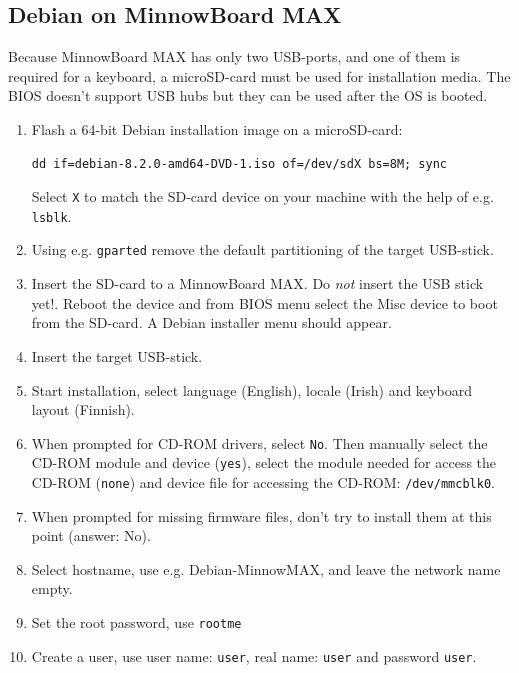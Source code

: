\documentclass[a4paper,11pt]{article}
\newcommand{\cmd}[1]{\texttt{#1}}
\begin{document}
\subsection{Debian on MinnowBoard MAX}
\label{minnowdebian}

Because MinnowBoard MAX has only two USB-ports, and one of them is required for a keyboard, a microSD-card must be used for installation media. The BIOS doesn't support USB hubs but they can be used after the OS is booted.

\begin{enumerate}
\item Flash a 64-bit Debian installation image on a microSD-card:

\begin{lstlisting}
dd if=debian-8.2.0-amd64-DVD-1.iso of=/dev/sdX bs=8M; sync
\end{lstlisting}
Select \cmd{X} to match the SD-card device on your machine with the help of e.g. \cmd{lsblk}.

\item Using e.g. \cmd{gparted} remove the default partitioning of the target USB-stick.

\item Insert the SD-card to a MinnowBoard MAX. Do \emph{not} insert the USB stick yet!. Reboot the device and from BIOS menu select the Misc device to boot from the SD-card. A Debian installer menu should appear.

\item Insert the target USB-stick.

\item Start installation, select language (English), locale (Irish) and keyboard layout (Finnish).

\item When prompted for CD-ROM drivers, select \cmd{No}. Then manually select the CD-ROM module and device (\cmd{yes}), select the module needed for access the CD-ROM (\cmd{none}) and device file for accessing the CD-ROM: \cmd{/dev/mmcblk0}.

\item When prompted for missing firmware files, don't try to install them at this point (answer: No).

\item Select hostname, use e.g. Debian-MinnowMAX, and leave the network name empty.

\item Set the root password, use \cmd{rootme}

\item Create a user, use user name: \cmd{user}, real name: \cmd{user} and password \cmd{user}.


\end{enumerate}
\end{document}
